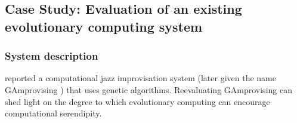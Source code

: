 
\subsection{Case Study: Evaluation of an existing evolutionary computing system} \label{sec:evomusic}

\subsubsection{System description}

 reported a computational jazz improvisation system
(later given the name {\sf GAmprovising} \cite{jordanous:12}) that
uses genetic algorithms.  Reevaluating {\sf GAmprovising} can shed
light on the degree to which evolutionary computing can encourage
computational serendipity.

